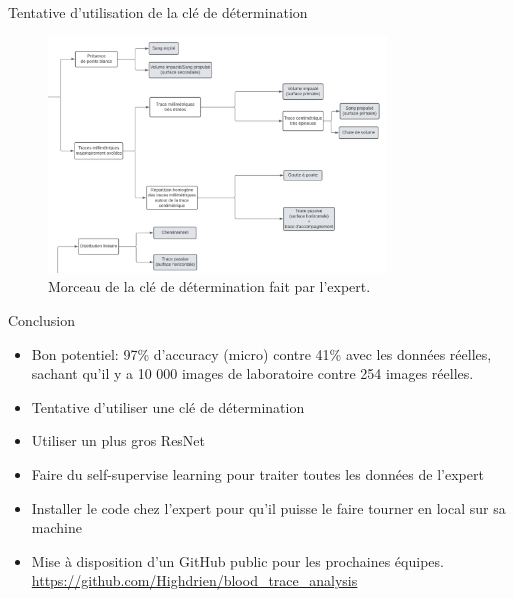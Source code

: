 \documentclass[11pt]{beamer}
\begin{document}
\begin{frame}{Tentative d'utilisation de la clé de détermination}
    \begin{figure}[ht]
        \centering
        \includegraphics[width=0.8\textwidth]{../ressources/morceau_cle_determination.png}
        \caption{Morceau de la clé de détermination fait par l'expert.}
    \end{figure}
\end{frame}


\begin{frame}{Conclusion}
    \begin{itemize}
        \item Bon potentiel: 97\% d'accuracy (micro) contre 41\% avec les données réelles, sachant qu'il y a 10 000 images de laboratoire contre 254 images réelles.
        \item Tentative d'utiliser une clé de détermination
        \item Utiliser un plus gros ResNet
        \item Faire du self-supervise learning pour traiter toutes les données de l'expert
        \item Installer le code chez l'expert pour qu'il puisse le faire tourner en local sur sa machine
        \item Mise à disposition d'un GitHub public pour les prochaines équipes. \url{https://github.com/Highdrien/blood_trace_analysis}
    \end{itemize}
\end{frame}
\end{document}

